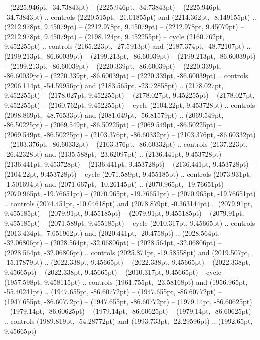  -- (2225.946pt, -34.73843pt)
 -- (2225.946pt, -34.73843pt)
 -- (2225.946pt, -34.73843pt) .. controls (2220.515pt, -21.01855pt) and (2214.362pt, -8.149155pt) .. (2212.978pt, 9.45079pt)
 -- (2212.978pt, 9.45079pt)
 -- (2212.978pt, 9.45079pt)
 -- (2212.978pt, 9.45079pt)
 -- (2198.124pt, 9.452255pt) -- cycle
(2160.762pt, 9.452255pt) .. controls (2165.223pt, -27.5913pt) and (2187.374pt, -48.72107pt) .. (2199.213pt, -86.60039pt)
 -- (2199.213pt, -86.60039pt)
 -- (2199.213pt, -86.60039pt)
 -- (2199.213pt, -86.60039pt)
 -- (2220.339pt, -86.60039pt)
 -- (2220.339pt, -86.60039pt)
 -- (2220.339pt, -86.60039pt)
 -- (2220.339pt, -86.60039pt) .. controls (2206.114pt, -54.59956pt) and (2183.565pt, -23.72858pt) .. (2178.027pt, 9.452255pt)
 -- (2178.027pt, 9.452255pt)
 -- (2178.027pt, 9.452255pt)
 -- (2178.027pt, 9.452255pt)
 -- (2160.762pt, 9.452255pt) -- cycle
(2104.22pt, 9.453728pt) .. controls (2098.869pt, -48.76533pt) and (2081.649pt, -56.81579pt) .. (2069.549pt, -86.50225pt)
 -- (2069.549pt, -86.50225pt)
 -- (2069.549pt, -86.50225pt)
 -- (2069.549pt, -86.50225pt)
 -- (2103.376pt, -86.60332pt)
 -- (2103.376pt, -86.60332pt)
 -- (2103.376pt, -86.60332pt)
 -- (2103.376pt, -86.60332pt) .. controls (2137.223pt, -26.42328pt) and (2135.588pt, -23.62097pt) .. (2136.441pt, 9.453728pt)
 -- (2136.441pt, 9.453728pt)
 -- (2136.441pt, 9.453728pt)
 -- (2136.441pt, 9.453728pt)
 -- (2104.22pt, 9.453728pt) -- cycle
(2071.589pt, 9.455185pt) .. controls (2073.931pt, -1.501694pt) and (2071.667pt, -10.26145pt) .. (2070.965pt, -19.76651pt)
 -- (2070.965pt, -19.76651pt)
 -- (2070.965pt, -19.76651pt)
 -- (2070.965pt, -19.76651pt) .. controls (2074.451pt, -10.04618pt) and (2078.879pt, -0.363144pt) .. (2079.91pt, 9.455185pt)
 -- (2079.91pt, 9.455185pt)
 -- (2079.91pt, 9.455185pt)
 -- (2079.91pt, 9.455185pt)
 -- (2071.589pt, 9.455185pt) -- cycle
(2010.317pt, 9.45665pt) .. controls (2013.434pt, -7.651962pt) and (2020.441pt, -20.4758pt) .. (2028.564pt, -32.06806pt)
 -- (2028.564pt, -32.06806pt)
 -- (2028.564pt, -32.06806pt)
 -- (2028.564pt, -32.06806pt) .. controls (2025.871pt, -19.58558pt) and (2019.507pt, -15.17879pt) .. (2022.338pt, 9.45665pt)
 -- (2022.338pt, 9.45665pt)
 -- (2022.338pt, 9.45665pt)
 -- (2022.338pt, 9.45665pt)
 -- (2010.317pt, 9.45665pt) -- cycle
(1957.598pt, 9.458115pt) .. controls (1961.755pt, -23.58168pt) and (1956.965pt, -55.40241pt) .. (1947.655pt, -86.60772pt)
 -- (1947.655pt, -86.60772pt)
 -- (1947.655pt, -86.60772pt)
 -- (1947.655pt, -86.60772pt)
 -- (1979.14pt, -86.60625pt)
 -- (1979.14pt, -86.60625pt)
 -- (1979.14pt, -86.60625pt)
 -- (1979.14pt, -86.60625pt) .. controls (1989.819pt, -54.28772pt) and (1993.733pt, -22.29596pt) .. (1992.65pt, 9.45665pt)
